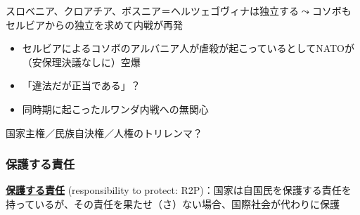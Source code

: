 \documentclass[
  xelatex,
  ja=standard]{bxjsarticle}
\providecommand{\tightlist}{%
  \setlength{\itemsep}{0pt}\setlength{\parskip}{0pt}}\usepackage{longtable,booktabs,array}
\begin{document}
スロベニア、クロアチア、ボスニア＝ヘルツェゴヴィナは独立する\(\leadsto\)コソボもセルビアからの独立を求めて内戦が再発

\begin{itemize}
\tightlist
\item
  セルビアによるコソボのアルバニア人が虐殺が起こっているとしてNATOが（安保理決議なしに）空爆
\item
  「違法だが正当である」？
\item
  同時期に起こったルワンダ内戦への無関心
\end{itemize}

国家主権／民族自決権／人権のトリレンマ？

\hypertarget{ux4fddux8b77ux3059ux308bux8cacux4efb}{%
\subsubsection{保護する責任}\label{ux4fddux8b77ux3059ux308bux8cacux4efb}}

\href{https://ir.library.osaka-u.ac.jp/repo/ouka/all/67203/}{\textbf{保護する責任}}
(responsibility to protect:
R2P)：国家は自国民を保護する責任を持っているが、その責任を果たせ（さ）ない場合、国際社会が代わりに保護
\end{document}
